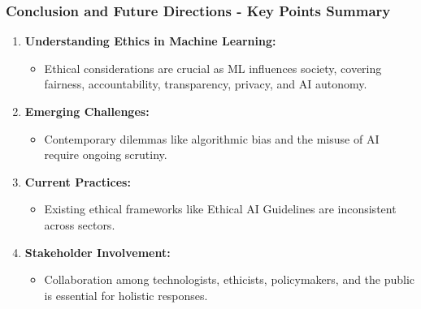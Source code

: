 \documentclass[aspectratio=169]{beamer}
\begin{document}
\begin{frame}[fragile]
    \frametitle{Conclusion and Future Directions - Key Points Summary}
    \begin{enumerate}
        \item \textbf{Understanding Ethics in Machine Learning:}
        \begin{itemize}
            \item Ethical considerations are crucial as ML influences society, covering fairness, accountability, transparency, privacy, and AI autonomy.
        \end{itemize}
        
        \item \textbf{Emerging Challenges:}
        \begin{itemize}
            \item Contemporary dilemmas like algorithmic bias and the misuse of AI require ongoing scrutiny.
        \end{itemize}

        \item \textbf{Current Practices:}
        \begin{itemize}
            \item Existing ethical frameworks like Ethical AI Guidelines are inconsistent across sectors.
        \end{itemize}

        \item \textbf{Stakeholder Involvement:}
        \begin{itemize}
            \item Collaboration among technologists, ethicists, policymakers, and the public is essential for holistic responses.
        \end{itemize}
    \end{enumerate}
\end{frame}
\end{document}
